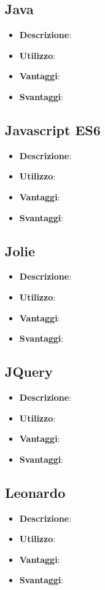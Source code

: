 \subsection{Java}
\begin{itemize}
	\item \textbf{Descrizione}:
	\item \textbf{Utilizzo}:
	\item \textbf{Vantaggi}:
	\item \textbf{Svantaggi}:
\end{itemize}

\subsection{Javascript ES6}
\begin{itemize}
	\item \textbf{Descrizione}:
	\item \textbf{Utilizzo}:
	\item \textbf{Vantaggi}:
	\item \textbf{Svantaggi}:
\end{itemize}

\subsection{Jolie}
\begin{itemize}
	\item \textbf{Descrizione}:
	\item \textbf{Utilizzo}:
	\item \textbf{Vantaggi}:
	\item \textbf{Svantaggi}:
\end{itemize}

\subsection{JQuery}
\begin{itemize}
	\item \textbf{Descrizione}:
	\item \textbf{Utilizzo}:
	\item \textbf{Vantaggi}:
	\item \textbf{Svantaggi}:
\end{itemize}

\subsection{Leonardo}
\begin{itemize}
	\item \textbf{Descrizione}:
	\item \textbf{Utilizzo}:
	\item \textbf{Vantaggi}:
	\item \textbf{Svantaggi}:
\end{itemize}

